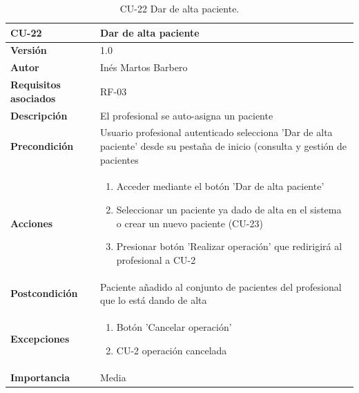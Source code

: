 \begin{table}[p]
	\centering
	\begin{tabularx}{\linewidth}{ p{} p{} }
		\toprule
		\textbf{CU-22}    & \textbf{Dar de alta paciente}\\
		\toprule
		\textbf{Versión}              & 1.0    \\
		\textbf{Autor}                & Inés Martos Barbero \\
		\textbf{Requisitos asociados} & RF-03 \\
		\textbf{Descripción}          & El profesional se auto-asigna un paciente \\
		\textbf{Precondición}         & Usuario profesional autenticado selecciona 'Dar de alta paciente' desde su pestaña de inicio (consulta y gestión de pacientes \\
		\textbf{Acciones}             &
		\begin{enumerate}
			\def\labelenumi{\arabic{enumi}.}
			\tightlist
			\item Acceder mediante el botón 'Dar de alta paciente'
			\item Seleccionar un paciente ya dado de alta en el sistema o crear un nuevo paciente (CU-23)
            \item Presionar botón 'Realizar operación' que redirigirá al profesional a CU-2
		\end{enumerate}\\
		\textbf{Postcondición}        & Paciente añadido al conjunto de pacientes del profesional que lo está dando de alta \\
		\textbf{Excepciones}          & 
        \begin{enumerate}
			\def\labelenumi{\arabic{enumi}.}
			\tightlist
			\item Botón 'Cancelar operación'
            \item CU-2 operación cancelada
		\end{enumerate}\\
		\textbf{Importancia}          & Media\\
		\bottomrule
	\end{tabularx}
	\caption{CU-22 Dar de alta paciente.}
\end{table}

